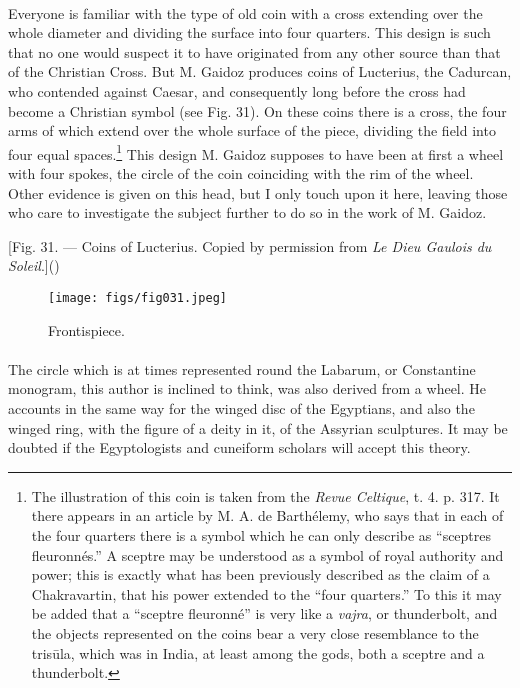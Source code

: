 \documentclass[a4paper, 11pt, oneside, polutonikogreek, english]{article}
\begin{document}
\paragraph{}
Everyone is familiar with the type of old coin with a cross extending over the whole diameter and dividing the surface into four quarters. This design is such that no one would suspect it to have originated from any other source than that of the Christian Cross. But M. Gaidoz produces coins of Lucterius, the Cadurcan, who contended against Caesar, and consequently long before the cross had become a Christian symbol (see Fig. 31). On these coins there is a cross, the four arms of which extend over the whole surface of the piece, dividing the field into four equal spaces.\footnote{The illustration of this coin is taken from the \emph{Revue Celtique}, t. 4. p. 317. It there appears in an article by M. A. de Barthélemy, who says that in each of the four quarters there is a symbol which he can only describe as ``sceptres fleuronnés.'' A sceptre may be understood as a symbol of royal authority and power; this is exactly what has been previously described as the claim of a Chakravartin, that his power extended to the ``four quarters.'' To this it may be added that a ``sceptre fleuronné'' is very like a \emph{vajra}, or thunderbolt, and the objects represented on the coins bear a very close resemblance to the trisūla, which was in India, at least among the gods, both a sceptre and a thunderbolt.} This design M. Gaidoz supposes to have been at first a wheel with four spokes, the circle of the coin coinciding with the rim of the wheel. Other evidence is given on this head, but I only touch upon it here, leaving those who care to investigate the subject further to do so in the work of M. Gaidoz.

[Fig. 31. --- Coins of Lucterius. Copied by permission from \emph{Le Dieu Gaulois du Soleil}.]()
\begin{figure}[H]
\centering
\texttt{[image: figs/fig031.jpeg]}
\caption{Frontispiece.}
\end{figure}
\paragraph{}
The circle which is at times represented round the Labarum, or Constantine monogram, this author is inclined to think, was also derived from a wheel. He accounts in the same way for the winged disc of the Egyptians, and also the winged ring, with the figure of a deity in it, of the Assyrian sculptures. It may be doubted if the Egyptologists and cuneiform scholars will accept this theory.
\end{document}
